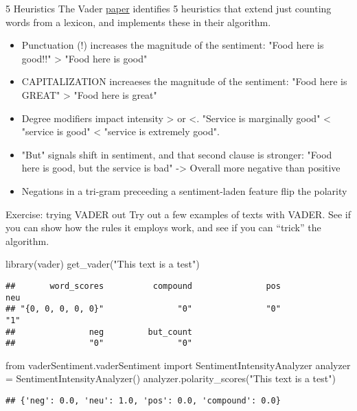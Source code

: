 \documentclass[
  10pt,
  ignorenonframetext,
  aspectratio=169]{beamer}
\newenvironment{Shaded}{\begin{snugshade}}{\end{snugshade}}
\newcommand{\FunctionTok}[1]{\textcolor[rgb]{0.94,0.94,0.56}{#1}}
\newcommand{\ImportTok}[1]{\textcolor[rgb]{0.80,0.80,0.80}{#1}}
\newcommand{\NormalTok}[1]{\textcolor[rgb]{0.80,0.80,0.80}{#1}}
\newcommand{\OperatorTok}[1]{\textcolor[rgb]{0.94,0.94,0.82}{#1}}
\newcommand{\StringTok}[1]{\textcolor[rgb]{0.80,0.58,0.58}{#1}}
\begin{document}
\begin{frame}{5 Heuristics}
\protect\hypertarget{heuristics}{}
The Vader
\href{https://www.aaai.org/ocs/index.php/ICWSM/ICWSM14/paper/view/8109/8122}{paper}
identifies 5 heuristics that extend just counting words from a lexicon,
and implements these in their algorithm.

\begin{itemize}
  \item<1->Punctuation (!) increases the magnitude of the sentiment: "Food here is good!!" > "Food here is good"
  \item<2->CAPITALIZATION increaeses the magnitude of the sentiment: "Food here is GREAT" > "Food here is great"
  \item<3->Degree modifiers impact intensity > or <. "Service is marginally good" < "service is good" < "service is extremely good".
  \item<4->"But" signals shift in sentiment, and that second clause is stronger: "Food here is good, but the service is bad" -> Overall more negative than positive
  \item<5->Negations in a tri-gram preceeding a sentiment-laden feature flip the polarity
\end{itemize}
\end{frame}

\begin{frame}[fragile]{Exercise: trying VADER out}
\protect\hypertarget{exercise-trying-vader-out}{}
Try out a few examples of texts with VADER. See if you can show how the
rules it employs work, and see if you can ``trick'' the algorithm.

\medskip

\begin{Shaded}
\begin{Highlighting}[]
\FunctionTok{library}\NormalTok{(vader)}
\FunctionTok{get\_vader}\NormalTok{(}\StringTok{"This text is a test"}\NormalTok{)}
\end{Highlighting}
\end{Shaded}

\begin{verbatim}
##       word_scores          compound               pos               neu 
## "{0, 0, 0, 0, 0}"               "0"               "0"               "1" 
##               neg         but_count 
##               "0"               "0"
\end{verbatim}

\medskip

\begin{Shaded}
\begin{Highlighting}[]
\ImportTok{from}\NormalTok{ vaderSentiment.vaderSentiment }\ImportTok{import}\NormalTok{ SentimentIntensityAnalyzer}
\NormalTok{analyzer }\OperatorTok{=}\NormalTok{ SentimentIntensityAnalyzer()}
\NormalTok{analyzer.polarity\_scores(}\StringTok{"This text is a test"}\NormalTok{)}
\end{Highlighting}
\end{Shaded}

\begin{verbatim}
## {'neg': 0.0, 'neu': 1.0, 'pos': 0.0, 'compound': 0.0}
\end{verbatim}
\end{frame}
\end{document}
